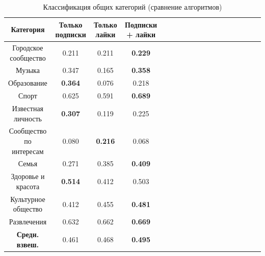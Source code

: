 \documentclass[times,specification,annotation]{itmo-student-thesis}
\begin{document}
\begin{table}[!h]
\caption{Классификация общих категорий (сравнение алгоритмов)}\label{tab-all-g}
\centering
\begin{tabular}{|*{18}{c|}}\hline
Категория & Только подписки  & Только лайки & Подписки + лайки \\\hline
Городское сообщество         & 0.211 & 0.211 &\textbf{0.229}  \\\hline
Музыка         & 0.347 & 0.165 & \textbf{0.358}  \\\hline
Образование         & \textbf{0.364} & 0.076 & 0.218 \\\hline
Спорт         & 0.625 & 0.591 & \textbf{0.689}    \\\hline
Известная личность         & \textbf{0.307} & 0.119 & 0.225 \\\hline
Сообщество по интересам         & 0.080 & \textbf{0.216} & 0.068 \\\hline
Семья         & 0.271 & 0.385 & \textbf{0.409} \\\hline
Здоровье и красота          & \textbf{0.514} & 0.412 & 0.503 \\\hline
Культурное общество         & 0.412 & 0.455 & \textbf{0.481} \\\hline
Развлечения           & 0.632 & 0.662 & \textbf{0.669} \\\hline
\textbf{Средн. взвеш.}  & 0.461 & 0.468 & \textbf{0.495}  \\\hline
\end{tabular}
\end{table}
\end{document}
